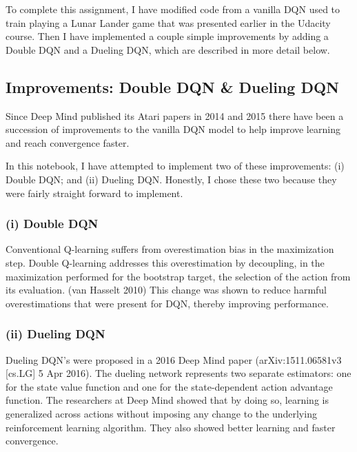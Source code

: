 \documentclass[11pt]{article}
\begin{document}
To complete this assignment, I have modified code from a vanilla DQN
used to train playing a Lunar Lander game that was presented earlier in
the Udacity course. Then I have implemented a couple simple improvements
by adding a Double DQN and a Dueling DQN, which are described in more
detail below.

\hypertarget{improvements-double-dqn-dueling-dqn}{%
\subsection{Improvements: Double DQN \& Dueling
DQN}\label{improvements-double-dqn-dueling-dqn}}

Since Deep Mind published its Atari papers in 2014 and 2015 there have
been a succession of improvements to the vanilla DQN model to help
improve learning and reach convergence faster.

In this notebook, I have attempted to implement two of these
improvements: (i) Double DQN; and (ii) Dueling DQN. Honestly, I chose
these two because they were fairly straight forward to implement.

\hypertarget{i-double-dqn}{%
\subsubsection{(i) Double DQN}\label{i-double-dqn}}

Conventional Q-learning suffers from overestimation bias in the
maximization step. Double Q-learning addresses this overestimation by
decoupling, in the maximization performed for the bootstrap target, the
selection of the action from its evaluation. (van Hasselt 2010) This
change was shown to reduce harmful overestimations that were present for
DQN, thereby improving performance.

\hypertarget{ii-dueling-dqn}{%
\subsubsection{(ii) Dueling DQN}\label{ii-dueling-dqn}}

Dueling DQN's were proposed in a 2016 Deep Mind paper
(arXiv:1511.06581v3 {[}cs.LG{]} 5 Apr 2016). The dueling network
represents two separate estimators: one for the state value function and
one for the state-dependent action advantage function. The researchers
at Deep Mind showed that by doing so, learning is generalized across
actions without imposing any change to the underlying reinforcement
learning algorithm. They also showed better learning and faster
convergence.
\end{document}
